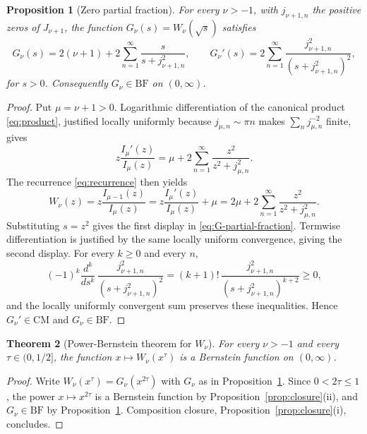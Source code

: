 \documentclass[preprint,12pt]{elsarticle}
\theoremstyle{plain}
\newtheorem{theorem}{Theorem}[section]
\newtheorem{proposition}[theorem]{Proposition}
\theoremstyle{definition}
\theoremstyle{remark}
\newcommand{\CM}{\mathrm{CM}}
\newcommand{\BF}{\mathrm{BF}}
\begin{document}
\begin{proposition}[Zero partial fraction]\label{prop:partial-fraction}
For every \(\nu>-1\), with \(j_{\nu+1,n}\) the positive zeros of
\(J_{\nu+1}\), the function \(G_\nu(s)=W_\nu(\sqrt s)\) satisfies
\begin{equation}\label{eq:G-partial-fraction}
G_\nu(s)=2(\nu+1)+2\sum_{n=1}^{\infty}\frac{s}{s+j_{\nu+1,n}^2},
\qquad
G_\nu'(s)=2\sum_{n=1}^{\infty}\frac{j_{\nu+1,n}^2}{(s+j_{\nu+1,n}^2)^2},
\end{equation}
for \(s>0\). Consequently \(G_\nu\in\BF\) on \((0,\infty)\).
\end{proposition}
\begin{proof}
Put \(\mu=\nu+1>0\). Logarithmic differentiation of the canonical product
\eqref{eq:product}, justified locally uniformly because
\(j_{\mu,n}\sim\pi n\) makes \(\sum_n j_{\mu,n}^{-2}\) finite, gives
\begin{equation}
z\frac{I_\mu'(z)}{I_\mu(z)}
=\mu+2\sum_{n=1}^{\infty}\frac{z^2}{z^2+j_{\mu,n}^2}.
\end{equation}
The recurrence \eqref{eq:recurrence} then yields
\begin{equation}
W_\nu(z)=z\frac{I_{\mu-1}(z)}{I_\mu(z)}
=z\frac{I_\mu'(z)}{I_\mu(z)}+\mu
=2\mu+2\sum_{n=1}^{\infty}\frac{z^2}{z^2+j_{\mu,n}^2}.
\end{equation}
Substituting \(s=z^2\) gives the first display in
\eqref{eq:G-partial-fraction}. Termwise differentiation is justified by the
same locally uniform convergence, giving the second display. For every
\(k\ge0\) and every \(n\),
\begin{equation}
(-1)^k\frac{d^k}{ds^k}\,
\frac{j_{\nu+1,n}^2}{(s+j_{\nu+1,n}^2)^2}
=(k+1)!\,\frac{j_{\nu+1,n}^2}{(s+j_{\nu+1,n}^2)^{k+2}}\ge0,
\end{equation}
and the locally uniformly convergent sum preserves these inequalities. Hence
\(G_\nu'\in\CM\) and \(G_\nu\in\BF\).
\end{proof}

\begin{theorem}[Power-Bernstein theorem for \(W_\nu\)]\label{thm:yang-tian}
For every \(\nu>-1\) and every \(\tau\in(0,1/2]\), the function
\(x\mapsto W_\nu(x^\tau)\) is a Bernstein function on \((0,\infty)\).
\end{theorem}
\begin{proof}
Write \(W_\nu(x^\tau)=G_\nu(x^{2\tau})\) with \(G_\nu\) as in
Proposition~\ref{prop:partial-fraction}. Since \(0<2\tau\le1\), the power
\(x\mapsto x^{2\tau}\) is a Bernstein function by
Proposition~\ref{prop:closure}(ii), and \(G_\nu\in\BF\) by
Proposition~\ref{prop:partial-fraction}. Composition closure,
Proposition~\ref{prop:closure}(i), concludes.
\end{proof}
\end{document}
